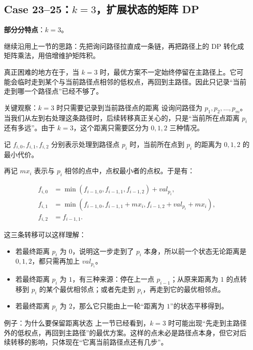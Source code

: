 \documentclass{book}
\begin{document}
\newpage
\subsection{Case 23--25：\texorpdfstring{$k=3$}{k=3}，扩展状态的矩阵 DP}
    \textbf{部分分特点}：$k=3$。

    继续沿用上一节的思路：先把询问路径拉直成一条链，再把路径上的 DP 转化成矩阵乘法，用倍增维护矩阵积。

    真正困难的地方在于，当 $k=3$ 时，最优方案不一定始终停留在主路径上。它可能会临时走到某个与当前路径点相邻的低权点，再回到主路径。因此只记录“当前走到哪一个路径点”已经不够了。

\begin{keybox}{关键观察：$k=3$ 时只需要记录到当前路径点的距离}
设询问路径为 $p_1,p_2,\dots,p_m$。当我们从左到右处理这条路径时，后续转移真正关心的，只是“当前所在点距离 $p_i$ 还有多远”。由于 $k=3$，这个距离只需要区分为 $0,1,2$ 三种情况。
\end{keybox}

    记 $f_{i,0},f_{i,1},f_{i,2}$ 分别表示处理到路径点 $p_i$ 时，当前所在点到 $p_i$ 的距离为 $0,1,2$ 的最小代价。

    再记 $mx_i$ 表示与 $p_i$ 相邻的点中，点权最小者的点权。于是有：

\begin{align*}
f_{i,0} &= \min(f_{i-1,0},f_{i-1,1},f_{i-1,2}) + val_{p_i}, \\
f_{i,1} &= \min(f_{i-1,0},f_{i-1,1}+mx_i,f_{i-1,2}+val_{p_i}+mx_i), \\
f_{i,2} &= f_{i-1,1}.
\end{align*}

    这三条转移可以这样理解：
\begin{itemize}[leftmargin=2em,itemsep=1pt,topsep=2pt,parsep=0pt,partopsep=0pt]
        \item 若最终距离 $p_i$ 为 $0$，说明这一步走到了 $p_i$ 本身，所以前一个状态无论距离是 $0,1,2$，都只需再加上 $val_{p_i}$。
        \item 若最终距离 $p_i$ 为 $1$，有三种来源：停在上一点 $p_{i-1}$；从原来距离为 $1$ 的点转移到 $p_i$ 的某个最优相邻点；或者先走到 $p_i$，再走到它的最优相邻点。
        \item 若最终距离 $p_i$ 为 $2$，那么它只能由上一轮“距离为 $1$”的状态平移得到。
    \end{itemize}

\begin{examplebox}{例子：为什么要保留距离状态}
上一节已经看到，$k=3$ 时可能出现“先走到主路径外的低权点，再回到主路径”的最优方案。这样的点未必是路径点本身，但它对后续转移的影响，只体现在“它离当前路径点还有几步”。
\end{examplebox}
\end{document}

